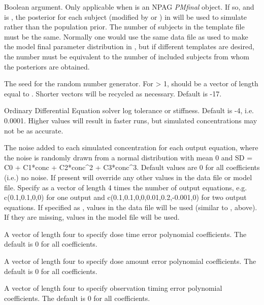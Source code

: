\documentclass[a4paper]{book}
\begin{document}
\begin{Arguments}
\begin{ldescription}
\item[\code{usePost}] Boolean argument.  Only applicable when  is an NPAG \emph{PMfinal} object.
If so, and  is , the posterior for each subject (modified by  or ) in  
will be used to simulate rather than the population prior.  The number of subjects in the template  file
must be the same.  Normally one would use the same data file as used to make the model final parameter distribution in ,
but if different templates are desired, the number must be equivalent to the number of included subjects from whom the posteriors are obtained.

\item[\code{seed}] The seed for the random number generator.  For  > 1, should be a vector of length equal to .
Shorter vectors will be recycled as necessary.  Default is -17.

\item[\code{ode}] Ordinary Differential Equation solver log tolerance or stiffness.  Default is -4, i.e. 0.0001.  Higher values will result in faster
runs, but simulated concentrations may not be as accurate.

\item[\code{obsNoise}] The noise added to each simulated concentration for each output equation, where the noise
is randomly drawn from a normal distribution with mean 0 and SD = C0 + C1*conc + C2*conc\textasciicircum{}2 + C3*conc\textasciicircum{}3.
Default values are 0 for all coefficients (i.e.) no noise. If present will override any other values in the data file or model file.
Specify as a vector of length 4 times the number of output equations, e.g.
c(0.1,0.1,0,0) for one output and c(0.1,0.1,0,0,0.01,0.2,-0.001,0) for two output equations.
If specified as , values in the data file will be used (similar to , above).  If they are missing, values in the model file
will be used.

\item[\code{doseTimeNoise}] A vector of length four to specify dose time error polynomial coefficients.  The default is 0 for all coefficients.

\item[\code{doseNoise}] A vector of length four to specify dose amount error polynomial coefficients.  The default is 0 for all coefficients.

\item[\code{obsTimeNoise}] A vector of length four to specify observation timing error polynomial coefficients.  The default is 0 for all coefficients.


\end{ldescription}
\end{Arguments}
\end{document}
